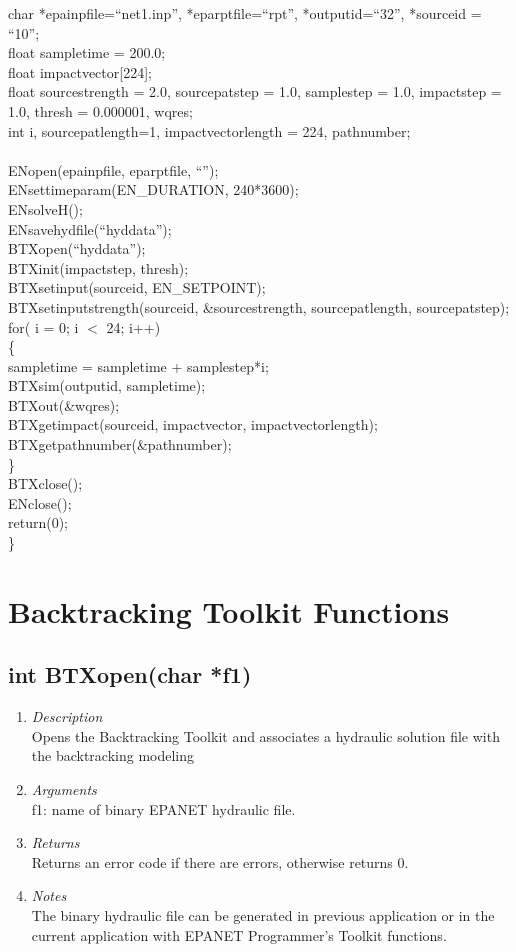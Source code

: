 \documentclass[12pt,letterpaper]{article}
\begin{document}
char *epainpfile=``net1.inp'', *eparptfile=``rpt'', *outputid=``32'', *sourceid = ``10'';\\
float sampletime = 200.0;\\
float impactvector[224];\\
float sourcestrength = 2.0, sourcepatstep = 1.0, samplestep = 1.0, impactstep = 1.0, thresh = 0.000001, wqres;\\
int i, sourcepatlength=1, impactvectorlength = 224, pathnumber;\\
\\ENopen(epainpfile, eparptfile, ``'');\\
ENsettimeparam(EN\_DURATION, 240*3600);\\
ENsolveH();\\
ENsavehydfile(``hyddata'');\\
BTXopen(``hyddata'');\\
BTXinit(impactstep, thresh);\\
BTXsetinput(sourceid, EN\_SETPOINT);\\
BTXsetinputstrength(sourceid, \&sourcestrength, sourcepatlength, sourcepatstep);\\
for( i = 0; i $<$ 24; i++)\\\{\\
sampletime = sampletime + samplestep*i;\\
BTXsim(outputid, sampletime);\\
BTXout(\&wqres);\\
BTXgetimpact(sourceid, impactvector, impactvectorlength);\\
BTXgetpathnumber(\&pathnumber);
\\\}\\
BTXclose();\\ENclose();\\
return(0);\\
\}
\section*{Backtracking Toolkit Functions}
\subsection*{int BTXopen(char *f1)}
\begin{enumerate}
\item {\it Description}\\Opens the Backtracking Toolkit and associates a hydraulic solution
file with the backtracking modeling
\item {\it Arguments}\\
f1: name of binary EPANET hydraulic file.
\item {\it Returns}\\Returns an error code if there are errors, otherwise returns 0.
\item {\it Notes}\\The binary hydraulic file can be generated in
previous application or in the current application with EPANET
Programmer's Toolkit functions.
\end{enumerate}
\end{document}
